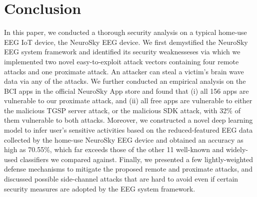 \section{Conclusion}
\label{sec:conclusion}

In this paper, we conducted a thorough security analysis on a typical home-use EEG IoT device, the NeuroSky EEG device. We first demystified the NeuroSky EEG system framework and identified its security weaknesseses via which we implemented two novel easy-to-exploit attack vectors containing four remote attacks and one proximate attack. An attacker can steal a victim's brain wave data via any of the attacks. We further conducted an empirical analysis on the BCI apps in the official NeuroSky App store and found that (i) all 156 apps are vulnerable to our proximate attack, and (ii) all free apps are vulnerable to either the malicious TGSP server attack, or the malicious SDK attack, with 32\% of them vulnerable to both attacks. Moreover, we constructed a novel deep learning model to infer user's sensitive activities based on the reduced-featured EEG data collected by the home-use NeuroSky EEG device and obtained an accuracy as high as 70.55\%, which far exceeds those of the other 11 well-known and widely-used classifiers we compared against. Finally, we presented a few lightly-weighted defense mechanisms to mitigate the proposed remote and proximate attacks, and discussed possible side-channel attacks that are hard to avoid even if certain security measures are adopted by the EEG system framework.